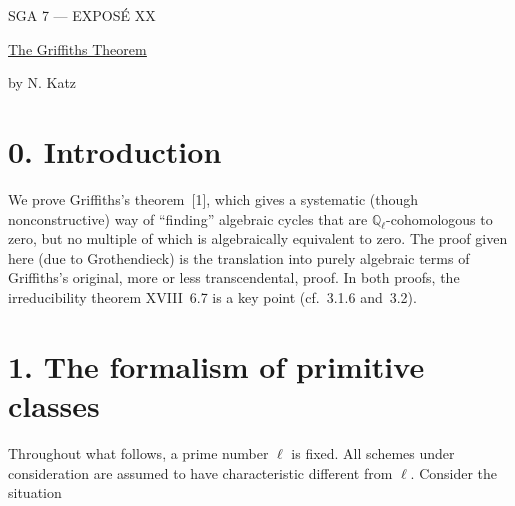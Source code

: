 \clearpage
\begin{center}
{\large SGA 7 --- EXPOS\'E XX}\par
\vspace{2em}
{\Large\underline{\underline{The Griffiths Theorem}}}\par
\vspace{1.5em}
{\large by N. Katz}
\end{center}

\section*{0. Introduction}

We prove Griffiths's theorem~[1], which gives a systematic (though
nonconstructive) way of ``finding'' algebraic cycles that are
$\mathbb Q_\ell$-cohomologous to zero, but no multiple of which is
algebraically equivalent to zero.  The proof given here (due to
Grothendieck) is the translation into purely algebraic terms of Griffiths's
original, more or less transcendental, proof.  In both proofs, the
irreducibility theorem XVIII~6.7 is a key point (cf.~3.1.6 and~3.2).

\section*{1. The formalism of primitive classes}

Throughout what follows, a prime number $\ell$ is fixed.  All schemes under
consideration are assumed to have characteristic different from $\ell$.
Consider the situation

